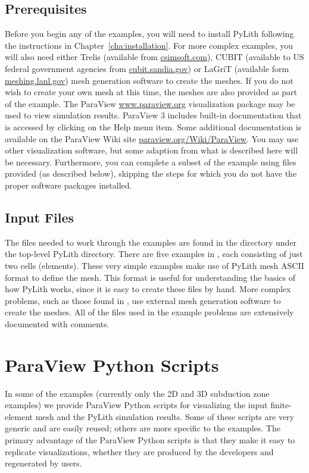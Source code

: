 \subsection{Prerequisites}

Before you begin any of the examples, you will need to install PyLith
following the instructions in Chapter~\vref{cha:installation}.  For
more complex examples, you will also need either Trelis (available
from \url{csimsoft.com}), CUBIT (available to US federal government
agencies from \url{cubit.sandia.gov}) or LaGriT (available form
\url{meshing.lanl.gov}) mesh generation software to create the
meshes. If you do not wish to create your own mesh at this time, the
meshes are also provided as part of the example. The ParaView
\url{www.paraview.org} visualization package may be used to view
simulation results. ParaView 3 includes built-in documentation that is
accessed by clicking on the Help menu item. Some additional
documentation is available on the ParaView Wiki site
\url{paraview.org/Wiki/ParaView}.  You may use other visualization
software, but some adaption from what is described here will be
necessary. Furthermore, you can complete a subset of the example using
files provided (as described below), skipping the steps for which you
do not have the proper software packages installed.


\subsection{Input Files}

The files needed to work through the examples are found in the
 directory under the top-level PyLith
directory. There are five examples in ,
each consisting of just two cells (elements).  These very simple
examples make use of PyLith mesh ASCII format to define the mesh. This
format is useful for understanding the basics of how PyLith works,
since it is easy to create these files by hand.  More complex
problems, such as those found in , use external
mesh generation software to create the meshes. All of the files used
in the example problems are extensively documented with comments.

\section{ParaView Python Scripts}
\label{sec:ParaView:Python:scripts}

In some of the examples (currently only the 2D and 3D subduction zone
examples) we provide ParaView Python scripts for visualizing the input
finite-element mesh and the PyLith simulation results. Some of these
scripts are very generic and are easily reused; others are more
specific to the examples. The primary advantage of the ParaView Python
scripts is that they make it easy to replicate visualizations, whether
they are produced by the developers and regenerated by users.

